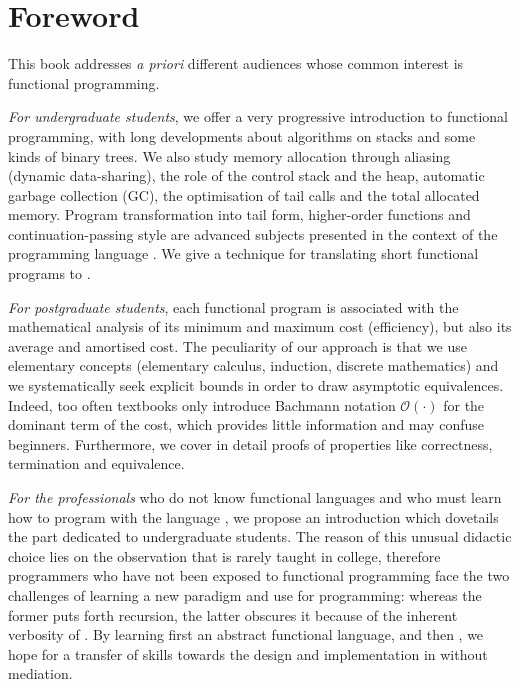 
\chapter*{Foreword}
\thispagestyle{empty}

This book addresses \emph{a priori} different audiences whose common interest
is functional programming.

\emph{For undergraduate students}, we offer a very progressive
introduction to functional programming, with long developments about
algorithms on stacks and some kinds of binary trees. We also study
memory allocation through aliasing (dynamic data-sharing), the role of
the control stack and the heap, automatic garbage collection (GC), the
optimisation of tail calls and the total allocated memory. Program
transformation into tail form, higher\hyp{}order functions and
continuation\hyp{}passing style are advanced subjects presented in the
context of the programming language \Erlang. We give a technique for
translating short functional programs to \Java.

\emph{For postgraduate students}, each functional program is
associated with the mathematical analysis of its minimum and maximum
cost (efficiency), but also its average and amortised cost. The
peculiarity of our approach is that we use elementary concepts
(elementary calculus, induction, discrete mathematics) and we
systematically seek explicit bounds in order to draw asymptotic
equivalences. Indeed, too often textbooks only introduce Bachmann
notation \(\mathcal{O}(\cdot)\) for the dominant term of the cost,
which provides little information and may confuse
beginners. Furthermore, we cover in detail proofs of properties like
correctness, termination and equivalence.

\emph{For the professionals} who do not know functional languages and
who must learn how to program with the language \XSLT, we propose an
introduction which dovetails the part dedicated to undergraduate
students. The reason of this unusual didactic choice lies on the
observation that \XSLT is rarely taught in college, therefore
programmers who have not been exposed to functional programming face
the two challenges of learning a new paradigm and use \XML for
programming: whereas the former puts forth recursion, the latter
obscures it because of the inherent verbosity of \XML. By learning
first an abstract functional language, and then \XML, we hope for a
transfer of skills towards the design and implementation in \XSLT
without mediation.

